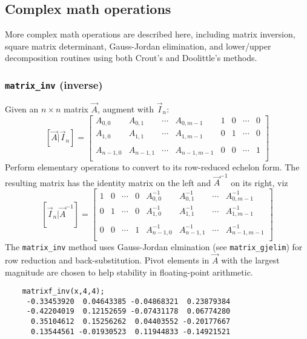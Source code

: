 % 
%
\subsection{Complex math operations}
\label{module:matrix:complex}
More complex math operations are described here, including matrix inversion,
square matrix determinant,
Gauss-Jordan elimination, and lower/upper decomposition routines using both
Crout's and Doolittle's methods.

\subsubsection{{\tt matrix\_inv} (inverse)}
\label{module:matrix:inv}
Given an $n \times n$ matrix $\vec{A}$, augment with $\vec{I}_n$:
\[
    \left[\vec{A}|\vec{I}_n\right] = 
    \left[
    \begin{array}{cccc|cccc}
    A_{0,0}     & A_{0,1}   & \cdots  & A_{0,m-1}   & 1 & 0 & \cdots & 0 \\
    A_{1,0}     & A_{1,1}   & \cdots  & A_{1,m-1}   & 0 & 1 & \cdots & 0 \\
                &           &         &             &   &   &        &   \\
    A_{n-1,0}   & A_{n-1,1} & \cdots  & A_{n-1,m-1} & 0 & 0 & \cdots & 1 \\
    \end{array}
    \right]
\]
Perform elementary operations to convert to its row-reduced echelon form.
The resulting matrix has the identity matrix on the left and $\vec{A}^{-1}$ on
its right, viz
\[
    \left[\vec{I}_n|\vec{A}^{-1}\right] = 
    \left[
    \begin{array}{cccc|cccc}
1 & 0 & \cdots & 0 & A^{-1}_{0,0}   & A^{-1}_{0,1}   & \cdots  & A^{-1}_{0,m-1}   \\
0 & 1 & \cdots & 0 & A^{-1}_{1,0}   & A^{-1}_{1,1}   & \cdots  & A^{-1}_{1,m-1}   \\
  &   &        &   &                &                &         &                  \\
0 & 0 & \cdots & 1 & A^{-1}_{n-1,0} & A^{-1}_{n-1,1} & \cdots  & A^{-1}_{n-1,m-1} \\
    \end{array}
    \right]
\]
The {\tt matrix\_inv} method uses Gauss-Jordan elmination (see 
{\tt matrix\_gjelim}) for row reduction and back-substitution.
Pivot elements in $\vec{A}$ with the largest magnitude are chosen to help
stability in floating-point arithmetic.
\begin{verbatim}
    matrixf_inv(x,4,4);
     -0.33453920  0.04643385 -0.04868321  0.23879384
     -0.42204019  0.12152659 -0.07431178  0.06774280
      0.35104612  0.15256262  0.04403552 -0.20177667
      0.13544561 -0.01930523  0.11944833 -0.14921521
\end{verbatim}

